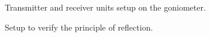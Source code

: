\documentclass{article}
\begin{document}
\begin{figure}[!h]
\begin{centering}

\caption{\label{fig:setup}Transmitter and receiver units setup on the goniometer.}
\end{centering}
\end{figure}

\begin{figure}[!h]
\begin{centering}

\caption{\label{fig:reflection}Setup to verify the principle of reflection.}
\end{centering}
\end{figure}
\end{document}

